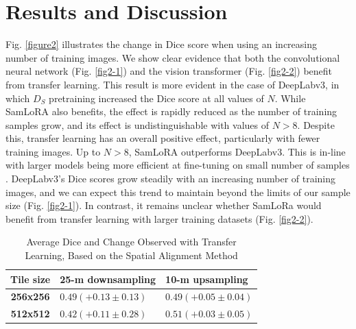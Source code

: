 \documentclass[lettersize,journal]{IEEEtran}
\begin{document}
\section{Results and Discussion} 
Fig. \ref{figure2} illustrates the change in Dice score when using an increasing number of training images. We show clear evidence that both the convolutional neural network (Fig. \ref{fig2-1}) 
and the vision transformer (Fig. \ref{fig2-2}) benefit from transfer learning. This result is more evident in the case of DeepLabv3, in which $\mathit{D}_S$ pretraining increased
the Dice score at all values of \( N \). While SamLoRA also benefits, the effect is rapidly reduced as the number of training samples grow, and its effect is undistinguishable with values 
of \( N > 8 \). Despite this, transfer learning has an overall positive effect, particularly with fewer training images. Up to \( N > 8 \), SamLoRA outperforms DeepLabv3. This is in-line with 
larger models being more efficient at fine-tuning on small number of samples \cite{zhaiScalingVisionTransformers2022}. DeepLabv3's Dice scores grow steadily with an increasing number of training images, 
and we can expect this trend to maintain beyond the limits of our sample size (Fig. \ref{fig2-1}). In contrast, it remains unclear whether SamLoRa would benefit from transfer learning with larger training datasets 
(Fig. \ref{fig2-2}).
\begin{table}[t]
    \caption{Average Dice and Change Observed with Transfer Learning, Based on the Spatial Alignment Method\label{table2}}
    \centering
    \begin{tabular}{c>{\centering\arraybackslash}m{3cm}>{\centering\arraybackslash}m{2.6cm}}
    \toprule
    \textbf{Tile size} & \textbf{25-m downsampling} & \textbf{10-m upsampling} \\
    \midrule
    \textbf{256x256} & $0.49 (+0.13 \pm 0.13)$ & $0.49 (+0.05 \pm 0.04)$ \\
    \textbf{512x512} & $0.42 (+0.11 \pm 0.28)$ & $0.51 (+0.03 \pm 0.05)$ \\
    \bottomrule
    \end{tabular}
\end{table}
\end{document}
